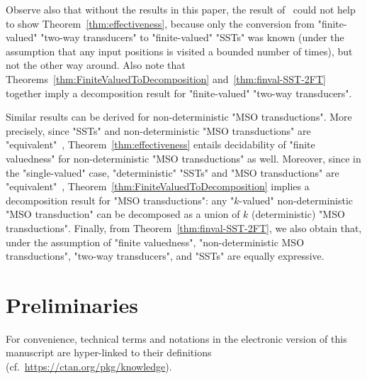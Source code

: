 \documentclass{theoretics}
\begin{document}
    Observe also that without the results in this paper, the result
    of~\cite{YenY22}   could not help to show
    Theorem~\ref{thm:effectiveness}, because 
    only the
    conversion from "finite-valued" "two-way transducers" to "finite-valued" "SSTs" was
    known (under the assumption that any input positions is visited a
    bounded number of times),
    but not the other way around. %
    Also note that Theorems~\ref{thm:FiniteValuedToDecomposition}
    and~\ref{thm:finval-SST-2FT} together
    imply a
    decomposition result for "finite-valued" "two-way transducers".

    Similar results can be derived for non-deterministic "MSO transductions". 
    More precisely, since "SSTs" and non-deterministic 
    "MSO transductions" are "equivalent"~\cite{DBLP:conf/icalp/AlurD11},
    Theorem~\ref{thm:effectiveness} entails decidability of
    "finite valuedness" for non-deterministic 
    "MSO transductions" as well. Moreover, since in the "single-valued" case, 
    "deterministic" "SSTs"
    and "MSO transductions" are "equivalent"~\cite{DBLP:conf/fsttcs/AlurC10}, 
    Theorem~\ref{thm:FiniteValuedToDecomposition} implies a decomposition result for 
    "MSO transductions": any "$k$-valued" non-deterministic 
    "MSO transduction" can be decomposed as a union of $k$ (deterministic) 
    "MSO transductions". Finally, from Theorem~\ref{thm:finval-SST-2FT}, we
    also obtain that, under the assumption of "finite valuedness", 
    "non-deterministic MSO transductions", 
    "two-way transducers", and "SSTs" are equally expressive.

  




\section{Preliminaries}\label{sec:preliminaries}


For convenience, technical terms and notations in the
electronic version of this manuscript are hyper-linked to their 
definitions (cf.~\url{https://ctan.org/pkg/knowledge}).
\end{document}
